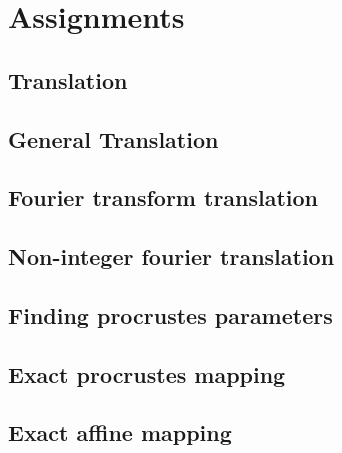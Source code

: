 %
%


\section{Assignments}
\label{appendix:assignments}

\subsection{Translation}
\label{assign:translation}

\subsection{General Translation}
\label{assign:general-translation}

\subsection{Fourier transform translation}
\label{assign:fourier-translation}

\subsection{Non-integer fourier translation}
\label{assign:non-integer-fourier-translation}

\subsection{Finding procrustes parameters}
\label{assign:finding-procrustes}

\subsection{Exact procrustes mapping}
\label{assign:procrustes-mapping}

\subsection{Exact affine mapping}
\label{assign:affine-mapping}

